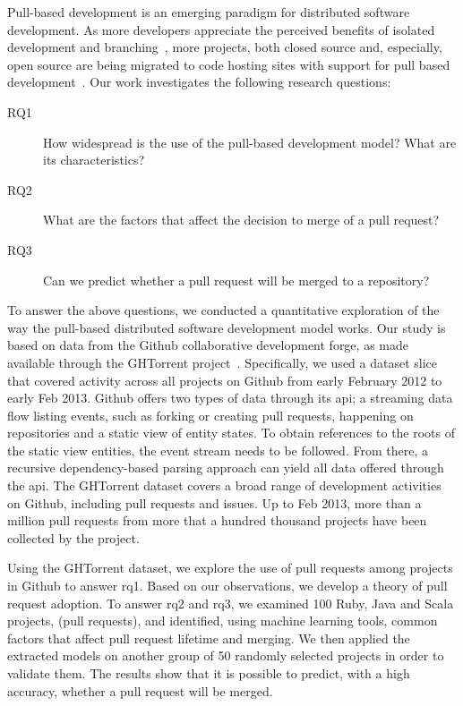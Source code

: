 \documentclass{sig-alternate}
\begin{document}
Pull-based development is an emerging paradigm for distributed software
development. As more developers appreciate the perceived benefits of isolated
development and branching~\cite{Bird12}, more projects, both closed source and,
especially, open source are being migrated to code hosting sites with support
for pull based development~\cite{Barr12}. Our work investigates the following
research questions:

\begin{description}
  
  \item[RQ1] How widespread is the use of the pull-based development model? What
    are its characteristics?
  
  \item[RQ2] What are the factors that affect the decision to merge of a pull request?

  \item[RQ3] Can we predict whether a pull request will be merged to a
    repository?

\end{description}

To answer the above questions, we conducted a quantitative exploration of the
way the pull-based distributed software development model works.
Our study is based on data from the Github
collaborative development forge, as made available through the GHTorrent
project~\cite{GS12}. Specifically, we used a dataset slice that covered activity
across all projects on Github from early February 2012 to early Feb 2013.
Github offers two types of data through its {\sc api}; a streaming data flow
listing events, such as forking or creating pull requests, happening on
repositories and a static view of entity states. To obtain references to the
roots of the static view entities, the event stream needs to be followed. From
there, a recursive dependency-based parsing approach can yield all data
offered through the {\sc api}. 
The GHTorrent dataset covers a broad range of development activities on Github,
including pull requests and issues. Up to Feb 2013, more than a million 
pull requests from more that a hundred thousand projects have been collected by the project.

Using the GHTorrent dataset, we explore the use of pull requests among projects
in Github to answer {\sc rq1}. Based on our observations, we develop a theory
of pull request adoption.
To answer {\sc rq2} and {\sc rq3}, we examined 100 Ruby, Java and Scala projects,
(pull requests), and identified, using machine
learning tools, common factors that affect pull request lifetime and merging. We
then applied the extracted models on another group of 50 randomly selected
projects in order to validate them. The results show that it is
possible to predict, with a high accuracy, whether a pull request will be
merged.
\end{document}
